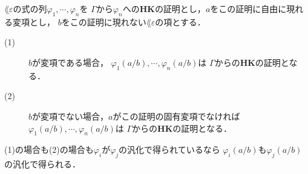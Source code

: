	\begin{screen}
		\begin{metathm}[証明に現れる変項に代入しても証明]
		\label{metathm:substitute_HK_proof}
			$\lang{\varepsilon}$の式の列$\varphi_{1},\cdots,\varphi_{n}$を
			$\Gamma$から$\varphi_{n}$への{\bf HK}の証明とし，$a$をこの証明に自由に現れる変項とし，
			$b$をこの証明に現れない$\lang{\varepsilon}$の項とする．
			\begin{description}
				\item[(1)] $b$が変項である場合，
					$\varphi_{1}(a/b),\cdots,\varphi_{n}(a/b)$は
					$\Gamma$からの{\bf HK}の証明となる．
				
				\item[(2)] $b$が変項でない場合\footnotemark，$a$がこの証明の固有変項でなければ
					$\varphi_{1}(a/b),\cdots,\varphi_{n}(a/b)$は
					$\Gamma$からの{\bf HK}の証明となる．
			\end{description}
			(1)の場合も(2)の場合も$\varphi_{i}$が$\varphi_{j}$の汎化で得られているなら
			$\varphi_{i}(a/b)$も$\varphi_{j}(a/b)$の汎化で得られる．
		\end{metathm}
	\end{screen}
	
	
